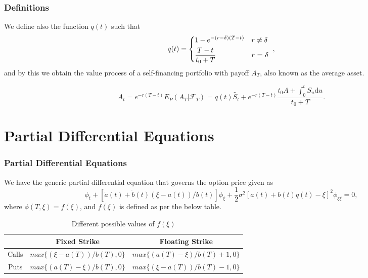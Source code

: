 \documentclass{beamer}
\begin{document}
  \begin{frame}
    \frametitle{Definitions}
    We define also the function \(q(t)\) such that
    \begin{equation}
      q(t) =
      \begin{dcases*}
        1 - e^{-(r-\delta)(T-t)} & \(r \neq \delta\) \\
        \frac{T-t}{t_0 + T} & \(r\) = \(\delta\)
      \end{dcases*},
    \end{equation}
    and by this we obtain the value process of a self-financing portfolio with payoff \(A_T\), also known as the average asset.

    \begin{equation}
      A_t = e^{-r(T-t)}E_P(A_T|\mathcal{F}_T) = q(t)\tilde{S_t} + e^{-r(T-t)} \frac{t_0 A + \int_0^tS_u\mathrm{d}u}{t_0+T}.
    \end{equation}
  \end{frame}

  \section{Partial Differential Equations}

  \begin{frame}
    \frametitle{Partial Differential Equations}
    We have the generic partial differential equation that governs the option price given as
    \begin{equation}
      \phi_t + [\dot{a}(t) + \dot{b}(t)(\xi - a(t))/b(t)]\phi_\xi + \frac{1}{2}\sigma^2[a(t)+b(t)q(t) - \xi]^2\phi_{\xi\xi} = 0,
    \end{equation}
    where \(\phi(T, \xi) = f(\xi)\), and \(f(\xi)\) is defined as per the below table.

    \begin{table}[h]
      \begin{tabular}{|c|c|c|}
        \hline
        & Fixed Strike & Floating Strike \\
        \hline
        Calls & \(max\{(\xi - a(T))/b(T), 0\}\) & \(max\{(a(T) - \xi)/b(T) + 1, 0\}\) \\
        Puts & \(max\{(a(T) - \xi)/b(T ), 0\}\) & \(max\{(\xi - a(T))/b(T) - 1, 0\}\)\\
        \hline
      \end{tabular}
      \caption{Different possible values of \(f(\xi)\)}
    \end{table}
  \end{frame}
\end{document}
